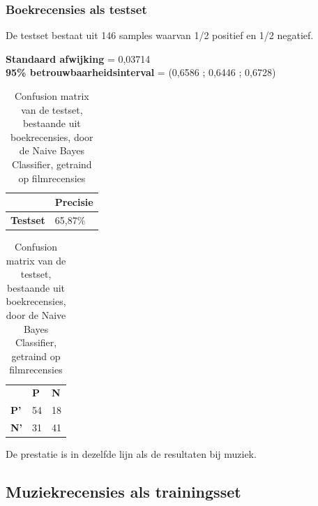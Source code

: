 \subsubsection{Boekrecensies als testset}\label{Boekrecensies testset-movie}

De testset bestaat uit 146 samples waarvan 1/2 positief en 1/2 negatief.


\textbf{Standaard afwijking} = 0,03714\\
\textbf{95\% betrouwbaarheidsinterval} = (0,6586 ; 0,6446 ; 0,6728)\\
 
\begin{table}[h]
\centering
\setlength\tabcolsep{4pt}
\begin{minipage}{0.48\textwidth}
\centering
\begin{tabular}{l|l|}
\cline{2-2}
                                            & \textbf{Precisie} \\ \hline
\multicolumn{1}{|l|}{\textbf{Testset}}      & 65,87\%           \\ \hline
\end{tabular}
\caption{Classificatieprecisie Naive Bayes Classifier, getraind op filmrecensies, getest op boekrecensies}
\end{minipage}%
\hfill
\begin{minipage}{0.48\textwidth}
\centering
\begin{tabular}{lll}
                                 & \textbf{P}               & \textbf{N}               \\ \cline{2-3} 
\multicolumn{1}{l|}{\textbf{P'}} & \multicolumn{1}{l|}{54} & \multicolumn{1}{l|}{18} \\ \cline{2-3} 
\multicolumn{1}{l|}{\textbf{N'}} & \multicolumn{1}{l|}{31} & \multicolumn{1}{l|}{41} \\ \cline{2-3} 
\end{tabular}
\caption{Confusion matrix van de testset, bestaande uit boekrecensies, door de  Naive Bayes Classifier, getraind op filmrecensies} 
\end{minipage}
\end{table}

De prestatie is in dezelfde lijn als de resultaten bij muziek. 

\subsection{Muziekrecensies als trainingsset}\label{Muziekrecensies als trainingsset}

